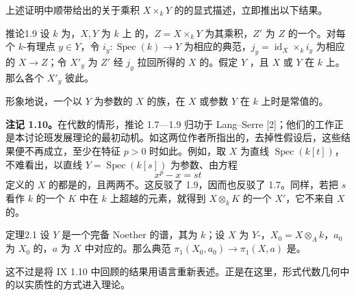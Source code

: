 上述证明中顺带给出的关于乘积 $X\times_k Y$ 的的显式描述，立即推出以下结果。
\begin{SGAresult}{推论}{1.9}
设 $k$ 为，$X,Y$ 为 $k$ 上 的，$Z=X\times_k Y$ 为其乘积，$Z'$ 为 $Z$ 的一个。对每个 $k$-有理点 $y\in Y$，令 $i_y:\operatorname{Spec}(k)\to Y$ 为相应的典范，$j_y=\operatorname{id}_X\times_k i_y$ 为相应的 $X\to Z$；令 $X'_y$ 为 $Z'$ 经 $j_y$ 拉回所得的 $X$ 的。假定 $Y$ ，且 $X$ 或 $Y$ 在 $k$ 上。那么各个 $X'_y$ 彼此。
\end{SGAresult}
形象地说，一个以 $Y$ 为参数的 $X$ 的族，在 $X$ 或参数 $Y$ 在 $k$ 上时是常值的。

\textbf{注记 1.10。}在代数的情形，推论 1.7—1.9 归功于 Lang–Serre [2]；他们的工作正是本讨论班发展理论的最初动机。如这两位作者所指出的，去掉性假设后，这些结果便不再成立，至少在特征 $p>0$ 时如此。例如，取 $X$ 为直线 $\operatorname{Spec}(k[t])$，不难看出，以直线 $Y=\operatorname{Spec}(k[s])$ 为参数、由方程
\[
x^p-x=st
\]
定义的 $X$ 的都是的，且两两不。这反驳了 1.9，因而也反驳了 1.7。同样，若把 $s$ 看作 $k$ 的一个 $K$ 中在 $k$ 上超越的元素，就得到 $X\otimes_k K$ 的一个 $X'$，它不来自 $X$ 的。

\begin{SGAresult}{定理}{2.1}
设 $Y$ 是一个完备 Noether 的谱，其为 $k$；设 $X$ 为 $Y$-，$X_0=X\otimes_A k$，$a_0$ 为 $X_0$ 的，$a$ 为 $X$ 中对应的。那么典范 $\pi_1(X_0,a_0)\to\pi_1(X,a)$ 是。
\end{SGAresult}
这不过是将 IX 1.10 中回顾的结果用语言重新表述。正是在这里，形式代数几何中的以实质性的方式进入理论。

